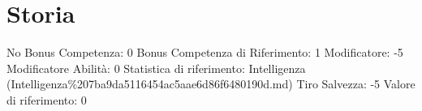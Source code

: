\section{Storia}\label{storia}

\begin{description}
\tightlist
\item[Tags: ABI]
No Bonus Competenza: 0 Bonus Competenza di Riferimento: 1 Modificatore:
-5 Modificatore Abilità: 0 Statistica di riferimento: Intelligenza
(Intelligenza\%207ba9da5116454ac5aae6d86f6480190d.md) Tiro Salvezza: -5
Valore di riferimento: 0
\end{description}
